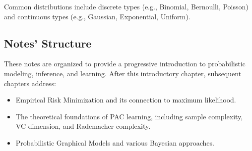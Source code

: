 Common distributions include discrete types (e.g., Binomial, Bernoulli, Poisson) and continuous types (e.g., Gaussian, Exponential, Uniform).

\subsection{Notes' Structure}
These notes are organized to provide a progressive introduction to probabilistic modeling, inference, and learning. After this introductory chapter, subsequent chapters address:
\begin{itemize}
    \item Empirical Risk Minimization and its connection to maximum likelihood.
    \item The theoretical foundations of PAC learning, including sample complexity, VC dimension, and Rademacher complexity.
    \item Probabilistic Graphical Models and various Bayesian approaches.
\end{itemize}